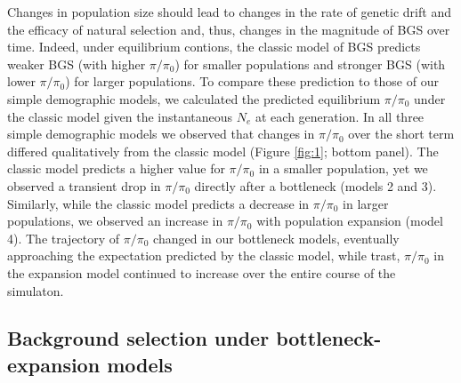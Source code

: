 \documentclass[9pt,twocolumn,twoside]{rilabRxiv}
\begin{document}
Changes in population size should lead to changes in the rate of genetic drift and the efficacy of natural selection and, thus, changes in the magnitude of BGS over time.
Indeed, under equilibrium contions, the classic model of BGS \citep{nordborg1996effect} predicts weaker BGS (with higher $\pi/\pi_0$) for smaller populations and stronger BGS (with lower $\pi/\pi_0$) for larger populations.
To compare these prediction to those of our simple demographic models, we calculated the predicted equilibrium $\pi/\pi_0$ under the classic model given the instantaneous $N_e$ at each generation.
In all three simple demographic models we observed that changes in $\pi/\pi_0$ over the short term differed qualitatively from the classic model  (Figure \ref{fig:1}; bottom panel).
The classic model predicts a higher value for $\pi/\pi_0$ in a smaller population, yet we observed a transient drop in $\pi/\pi_0$ directly after a bottleneck (models 2 and 3).
Similarly, while the classic model predicts a decrease in $\pi/\pi_0$ in larger populations, we observed an increase in $\pi/\pi_0$ with population expansion (model 4).
The trajectory of $\pi/\pi_0$ changed in our bottleneck models, eventually approaching the expectation predicted by the classic model, while trast, $\pi/\pi_0$ in the expansion model continued to increase over the entire course of the simulaton.

\subsection{Background selection under bottleneck-expansion models}
\end{document}
